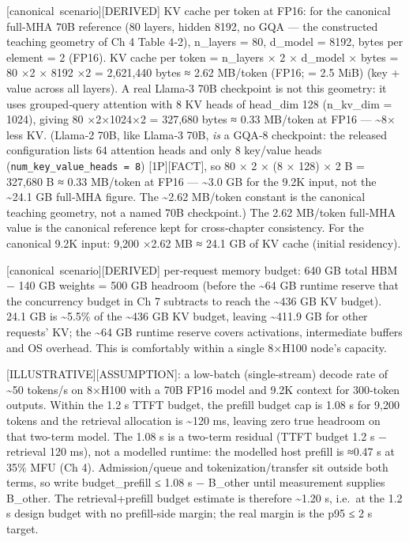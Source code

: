 \mbox{{[}canonical scenario{]}}\hspace{0pt}\mbox{{[}DERIVED{]}} KV cache per token at FP16: for
the canonical full‑MHA 70B reference (80 layers, hidden 8192, no GQA ---
the constructed teaching geometry of Ch 4 Table 4‑2), n\_layers = 80,
d\_model = 8192, bytes per element = 2 (FP16). KV cache per token =
n\_layers × 2 × d\_model × bytes = 80 ×2 × 8192 ×2 = 2,621,440 bytes ≈
2.62 MB/token (FP16; = 2.5 MiB) (key + value across all layers). A real
Llama‑3 70B checkpoint is not this geometry: it uses grouped‑query
attention with 8 KV heads of head\_dim 128 (n\_kv\_dim = 1024), giving
80 ×2×1024×2 = 327,680 bytes ≈ 0.33 MB/token at FP16 ---
\textasciitilde8× less KV. (Llama‑2 70B, like Llama‑3 70B, \emph{is} a
GQA‑8 checkpoint: the released configuration lists 64 attention heads
and only 8 key/value heads (\texttt{num\_key\_value\_heads\ =\ 8})
\mbox{{[}1P{]}}\hspace{0pt}\mbox{{[}FACT{]}}, so 80 × 2 × (8 × 128) × 2 B = 327,680 B ≈ 0.33
MB/token at FP16 --- \textasciitilde3.0 GB for the 9.2K input, not the
\textasciitilde24.1 GB full‑MHA figure. The \textasciitilde2.62 MB/token
constant is the canonical teaching geometry, not a named 70B
checkpoint.) The 2.62 MB/token full‑MHA value is the canonical reference
kept for cross‑chapter consistency. For the canonical 9.2K input: 9,200
×2.62 MB ≈ 24.1 GB of KV cache (initial residency).

\mbox{{[}canonical scenario{]}}\hspace{0pt}\mbox{{[}DERIVED{]}} per‑request memory budget: 640 GB
total HBM − 140 GB weights = 500 GB headroom (before the
\textasciitilde64 GB runtime reserve that the concurrency budget in Ch 7
subtracts to reach the \textasciitilde436 GB KV budget). 24.1 GB is
\textasciitilde5.5\% of the \textasciitilde436 GB KV budget, leaving
\textasciitilde411.9 GB for other requests' KV; the \textasciitilde64 GB
runtime reserve covers activations, intermediate buffers and OS
overhead. This is comfortably within a single 8×H100 node's capacity.

\mbox{{[}ILLUSTRATIVE{]}}\hspace{0pt}\mbox{{[}ASSUMPTION{]}}: a low-batch (single-stream) decode
rate of \textasciitilde50 tokens/s on 8×H100 with a 70B FP16 model and
9.2K context for 300‑token outputs. Within the 1.2 s TTFT budget, the
prefill budget cap is 1.08 s for 9,200 tokens and the retrieval
allocation is \textasciitilde120 ms, leaving zero true headroom on that
two-term model. The 1.08 s is a two-term residual (TTFT budget 1.2 s −
retrieval 120 ms), not a modelled runtime: the modelled host prefill is
≈0.47 s at 35\% MFU (Ch 4). Admission/queue and tokenization/transfer
sit outside both terms, so write budget\_prefill ≤ 1.08 s − B\_other
until measurement supplies B\_other. The retrieval+prefill budget
estimate is therefore \textasciitilde1.20 s, i.e.~at the 1.2 s design
budget with no prefill-side margin; the real margin is the p95 ≤ 2 s
target.


